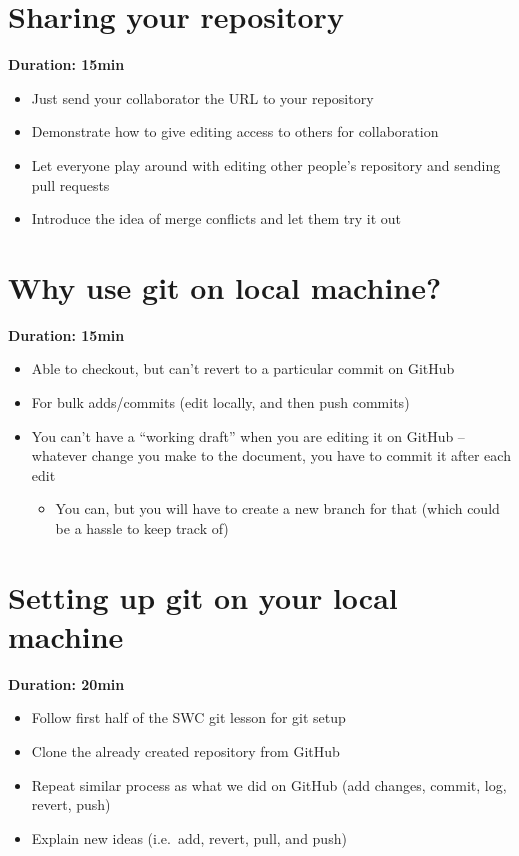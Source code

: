 \documentclass[a4paper, 12pt, oneside]{report} %
\begin{document}
\section{Sharing your repository}
\label{sec:sharing_your_repository}

{\bfseries Duration: 15min}

\begin{itemize}
	\item Just send your collaborator the URL to your repository
	\item Demonstrate how to give editing access to others for collaboration
	\item Let everyone play around with editing other people's repository and sending pull requests
	\item Introduce the idea of merge conflicts and let them try it out
\end{itemize}



\section{Why use git on local machine?}
\label{sec:why_use_git_on_local_machine}

{\bfseries Duration: 15min}

\begin{itemize}
	\item Able to checkout, but can't revert to a particular commit on GitHub
	\item For bulk adds/commits (edit locally, and then push commits)
	\item You can't have a ``working draft'' when you are editing it on GitHub -- whatever change you make to the document, you have to commit it after each edit
		\begin{itemize}
			\item You can, but you will have to create a new branch for that (which could be a hassle to keep track of)
		\end{itemize}
\end{itemize}


\section{Setting up git on your local machine}
\label{sec:setting_up_git_on_your_local_machine}

{\bfseries Duration: 20min}

\begin{itemize}
	\item Follow first half of the SWC git lesson for git setup
	\item Clone the already created repository from GitHub
	\item Repeat similar process as what we did on GitHub (add changes, commit, log, revert, push)
	\item Explain new ideas (i.e.\ add, revert, pull, and push)
\end{itemize}
\end{document}
